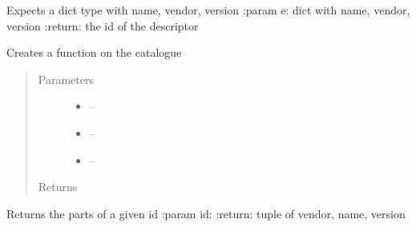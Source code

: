 \documentclass[letterpaper,10pt,english]{sphinxmanual}
\begin{document}

\begin{fulllineitems}
\label{_source/son_editor.impl:son_editor.impl.catalogue_servicesimpl.create_id}
Expects a dict type with name, vendor, version
:param e: dict with name, vendor, version
:return: the id of the descriptor

\end{fulllineitems}


\begin{fulllineitems}
\label{_source/son_editor.impl:son_editor.impl.catalogue_servicesimpl.create_in_catalogue}
Creates a function on the catalogue
\begin{quote}\begin{description}
\item[{Parameters}] \leavevmode\begin{itemize}
\item {} 
 -- 

\item {} 
 -- 

\item {} 
 -- 

\end{itemize}

\item[{Returns}] \leavevmode


\end{description}\end{quote}

\end{fulllineitems}


\begin{fulllineitems}
\label{_source/son_editor.impl:son_editor.impl.catalogue_servicesimpl.decode_id}
Returns the parts of a given id
:param id:
:return: tuple of vendor, name, version

\end{fulllineitems}
\end{document}

